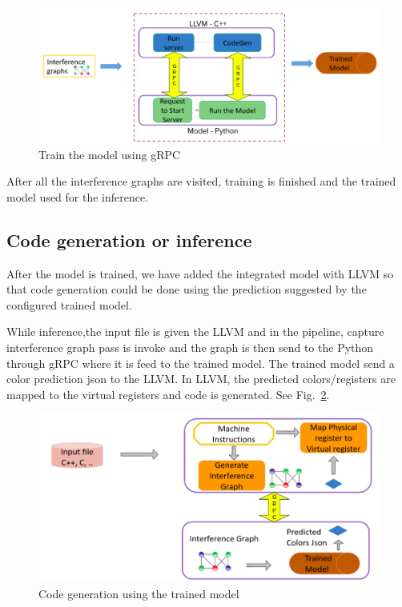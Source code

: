 \begin{figure}[t]
    \centering
    \includegraphics[scale=0.4]{figures/chapter-5/mlra_training.png}
    \caption{Train the model using gRPC}
     \label{fig:mlra-training}
\end{figure}

After all the interference graphs are visited, training is finished and the trained model used for the inference.
\subsection{Code generation or inference}
After the model is trained, we have added the integrated model with LLVM so that code generation could be done using the prediction suggested by the configured trained model.

While inference,the input file is given the LLVM and in the pipeline,  capture interference graph pass is invoke and the graph is then send to the Python through gRPC where it is feed to the trained model. The trained model send a color prediction json to the LLVM. In LLVM, the predicted colors/registers are mapped to the virtual registers and code is generated. See Fig.~\ref{fig:mlra-inference}.
\begin{figure}[t]
    \centering
    \includegraphics[scale=0.4]{figures/chapter-5/mlra_inference.png}
    \caption{Code generation using the trained model}
     \label{fig:mlra-inference}
\end{figure}

